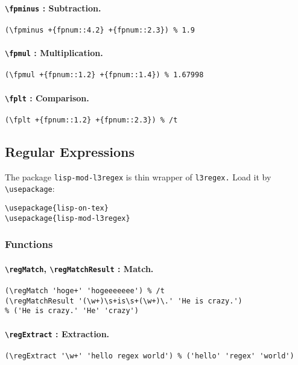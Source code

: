 \documentclass[10pt,a4paper]{article}
\newcommand{\pT}[1]{\textbf{\texttt{\textbackslash #1}}}
\begin{document}
\paragraph{\pT{fpminus} : Subtraction.}
\begin{verbatim}
(\fpminus +{fpnum::4.2} +{fpnum::2.3}) % 1.9
\end{verbatim}

\paragraph{\pT{fpmul} : Multiplication.}
\begin{verbatim}
(\fpmul +{fpnum::1.2} +{fpnum::1.4}) % 1.67998
\end{verbatim}

\paragraph{\pT{fplt} : Comparison.}
\begin{verbatim}
(\fplt +{fpnum::1.2} +{fpnum::2.3}) % /t
\end{verbatim}


\subsection{Regular Expressions}

The package \texttt{lisp-mod-l3regex} is thin wrapper
of \texttt{l3regex.} Load it by \verb|\usepackage|:

\begin{verbatim}
\usepackage{lisp-on-tex}
\usepackage{lisp-mod-l3regex}
\end{verbatim}

\subsubsection{Functions}

\paragraph{\pT{regMatch}, \pT{regMatchResult} : Match.}
\begin{verbatim}
(\regMatch 'hoge+' 'hogeeeeeee') % /t
(\regMatchResult '(\w+)\s+is\s+(\w+)\.' 'He is crazy.')
% ('He is crazy.' 'He' 'crazy')
\end{verbatim}

\paragraph{\pT{regExtract} : Extraction.}
\begin{verbatim}
(\regExtract '\w+' 'hello regex world') % ('hello' 'regex' 'world')
\end{verbatim}
\end{document}
